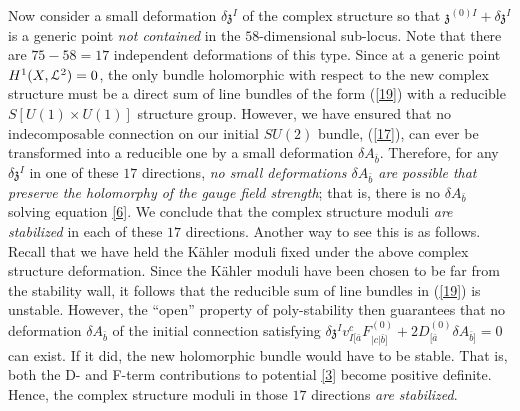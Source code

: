 \documentclass[12pt]{article}
\numberwithin{equation}{section}
\newcommand{\eref}[1]{(\ref{#1})}
\begin{document}
Now consider a small deformation $\delta{\mathfrak{z}}^{I}$ of the complex structure so that ${\mathfrak{z}}^{(0)I}+\delta{\mathfrak{z}}^{I}$ is a generic point {\it not contained} in the $58$-dimensional sub-locus. Note that there are $75-58=17$ independent deformations of this type.
Since at a generic point $H^1(X,{\cal L}^2)=0$, the only bundle holomorphic with respect to the new complex structure 
must be a direct sum of line bundles of the form \eref{19} with a reducible $S[U(1) \times U(1)]$ structure group. However, we have ensured that no indecomposable connection on our initial $SU(2)$ bundle, \eref{17}, can ever be transformed into a reducible one by a small deformation $\delta A_{\bar{b}}$. Therefore, for any $\delta{\mathfrak{z}}^{I}$ in one of these $17$ directions, {\it no small deformations $ \delta A_{\bar{b}}$ are possible that preserve the holomorphy of the gauge field strength}; that is,  there is no  $\delta A_{\bar{b}}$ solving equation \eqref{6}. We conclude that the complex structure moduli {\it are stabilized} in each of these $17$ directions.
Another way to see this is as follows. Recall that we have held the K\"ahler moduli fixed under the above complex structure deformation. Since the K\"ahler moduli have been chosen to be far from the stability wall, it follows that the reducible sum of line bundles in \eref{19} is unstable. However,
the ``open'' property of poly-stability \cite{Huybrechts} then guarantees that no deformation $\delta A_{{\bar{b}}}$ of the initial connection satisfying $\delta {\mathfrak{z}}^{I} v_{I [{\bar{a}}}^{c}F_{|c|{\bar{b}}]}^{(0)} + 2D^{(0)}_{[{\bar{a}}} \delta A_{{\bar{b}}]}=0$ can exist. If it did, the new holomorphic bundle would have to be stable. That is, both the D- and F-term contributions to potential \eqref{3} become positive definite. Hence, the complex structure moduli in those $17$ directions {\it are stabilized}.
\end{document}
